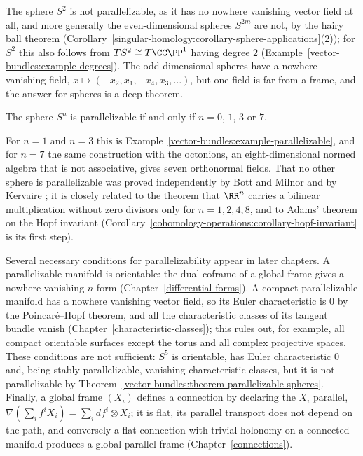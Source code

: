 The sphere $S^2$ is not parallelizable, as it has no nowhere vanishing vector field at all, and more generally the even-dimensional spheres $S^{2m}$ are not, by the hairy ball theorem
(Corollary~\ref{singular-homology:corollary-sphere-applications}(2)); for $S^2$ this also follows from $TS^2 \cong T\CC\PP^1$ having degree $2$ (Example~\ref{vector-bundles:example-degrees}). The odd-dimensional spheres
have a nowhere vanishing field, $x \mapsto (-x_2, x_1, -x_4, x_3, \ldots)$, but one field is far from a frame, and the answer for spheres is a deep theorem.

\begin{theorem}\label{vector-bundles:theorem-parallelizable-spheres}
The sphere $S^n$ is parallelizable if and only if $n = 0$, $1$, $3$ or $7$.
\end{theorem}

For $n = 1$ and $n = 3$ this is Example~\ref{vector-bundles:example-parallelizable}, and for $n = 7$ the same construction with the octonions, an eight-dimensional normed algebra that is not associative,
gives seven orthonormal fields. That no other sphere is parallelizable was proved independently by Bott and Milnor \cite{bott-milnor-1958} and by Kervaire \cite{kervaire-1958}; it is closely related to
the theorem that $\RR^n$ carries a bilinear multiplication without zero divisors only for $n = 1, 2, 4, 8$, and to Adams' theorem on the Hopf invariant \cite{adams-1960}
(Corollary~\ref{cohomology-operations:corollary-hopf-invariant} is its first step).

\begin{remark}\label{vector-bundles:remark-parallelizable-obstructions}
Several necessary conditions for parallelizability appear in later chapters. A parallelizable manifold is orientable: the dual coframe of a global frame gives a nowhere vanishing $n$-form
(Chapter~\ref{differential-forms}). A compact parallelizable manifold has a nowhere vanishing vector field, so its Euler characteristic is $0$ by the Poincar\'e--Hopf theorem, and all the characteristic
classes of its tangent bundle vanish (Chapter~\ref{characteristic-classes}); this rules out, for example, all compact orientable surfaces except the torus and all complex projective spaces. These
conditions are not sufficient: $S^5$ is orientable, has Euler characteristic $0$ and, being stably parallelizable, vanishing characteristic classes, but it is not parallelizable by
Theorem~\ref{vector-bundles:theorem-parallelizable-spheres}. Finally, a global frame $(X_i)$ defines a connection by declaring the $X_i$ parallel, $\nabla(\sum_if^iX_i) = \sum_idf^i \otimes X_i$; it is flat, its
parallel transport does not depend on the path, and conversely a flat connection with trivial holonomy on a connected manifold produces a global parallel frame (Chapter~\ref{connections}).
\end{remark}

